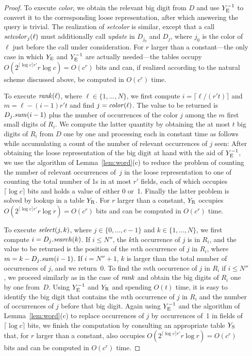 \documentclass[envcountsame,envcountsect,undated,nolinenumbers]{lnthi}
\def\Tvn#1{\hbox{\textit{#1\/}}}
\def\Tceil#1{\lceil #1\rceil}
\begin{document}
\begin{proof}
To execute \Tvn{color}, we obtain the
relevant big digit from $D$ and use $Y^{-1}_{\mbox{\scriptsize E}}$
to convert it to the corresponding loose
representation, after which answering
the query is trivial.
The realization of \Tvn{setcolor} is similar,
except that a call $\Tvn{setcolor}_j(\ell)$
must additionally call \Tvn{update} in
$D_{j_0}$ and $D_j$, where $j_0$ is the color
of $\ell$ just before the call under consideration.
For $r$ larger than a constant---the only case
in which $Y_{\mbox{\scriptsize E}}$ and $Y^{-1}_{\mbox{\scriptsize E}}$ are
actually needed---the tables occupy
$O(2^{\lceil\log c\rceil r'}r\log c)=O(c^r)$ bits
and can, if realized according to
the natural scheme discussed above, be computed in $O(c^r)$ time.

To execute $\Tvn{rank}(\ell)$,
where
$\ell\in\{1,\ldots,N\}$,
we first compute $i=\Tceil{{\ell/{(r't)}}}$ and
$m=\ell-(i-1)r't$ and find $j=\Tvn{color}(\ell)$.
The value to be returned is
$D_j.\Tvn{sum}(i-1)$ plus the number
of occurrences
of the color $j$ among the $m$ first small digits
of $R_i$.
We compute the latter quantity by obtaining
the at most $t$ big digits of $R_i$ from $D$ one
by one
and processing each in constant time as follows while
accumulating a count of the number of
relevant occurrences of $j$ seen:
After obtaining the loose representation of the
big digit at hand with the aid of $Y^{-1}_{\mbox{\scriptsize E}}$,
we use the algorithm of
Lemma~\ref{lem:word}(c) to reduce the problem
of counting the number of relevant occurrences
of~$j$ in the loose representation
to one of counting the total number of
1s in at most $r'$ fields,
each of which occupies $\Tceil{\log c}$ bits
and holds a value of either 0 or~1.
Finally the latter problem is solved
by lookup in a table $Y_{\mbox{\scriptsize R}}$.
For $r$ larger than a constant,
$Y_{\mbox{\scriptsize R}}$ occupies
$O(2^{\lceil\log c\rceil r'}r\log r)=O(c^r)$ bits
and can be computed in $O(c^r)$ time.

To execute $\Tvn{select}(j,k)$, where $j\in\{0,\ldots,c-1\}$ and
$k\in\{1,\ldots,N\}$,
we first compute $i=D_j.\Tvn{search}(k)$.
If $i\le N''$,
the $k$th occurrence of $j$ is in $R_i$,
and the value to be returned is the position
of the $m$th occurrence of $j$ in $R_i$,
where $m=k-D_j.\Tvn{sum}(i-1)$.
If $i=N''+1$, $k$ is larger than the total number
of occurrences of $j$, and we return~0.
To find the $m$th occurrence of $j$
in $R_i$ if $i\le N''$, we proceed similarly
as in the case of $\Tvn{rank}$ and
obtain the big digits of $R_i$ one by one
from~$D$.
Using $Y^{-1}_{\mbox{\scriptsize E}}$ and $Y_{\mbox{\scriptsize R}}$ and spending
$O(t)$ time, it is easy
to identify the big digit that contains the
$m$th occurrence of $j$ in $R_i$ and the number of
occurrences of $j$ before that big digit.
Again using $Y^{-1}_{\mbox{\scriptsize E}}$
and the algorithm of Lemma~\ref{lem:word}(c)
to replace occurrences of $j$ by occurrences
of~1 in fields of $\Tceil{\log c}$ bits,
we finish the computation by consulting an
appropriate table $Y_{\mbox{\scriptsize S}}$ that,
for $r$ larger than a constant,
also occupies $O(2^{\lceil\log c\rceil r'}r\log r)=O(c^r)$ bits
and can be computed in $O(c^r)$ time.


\end{proof}
\end{document}
